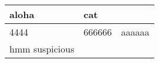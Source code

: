 \documentclass{article}
\begin{document}
 
\Large 
\begin{tabular}{|l|l|l|}
\hline 
aloha & cat & \\
\hline 
4444 & 666666 & aaaaaa\\
\hline 
hmm suspicious &  & \\
\hline 
\end{tabular}
\end{document}
